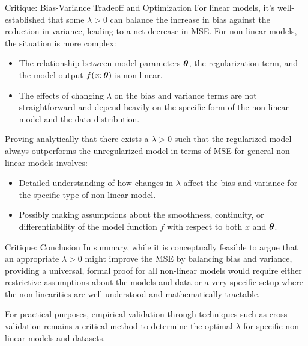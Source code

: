 \documentclass[11pt,compress,t,notes=noshow, xcolor=table]{beamer}
\begin{document}
\begin{vbframe}{Critique: Bias-Variance Tradeoff and Optimization}
For linear models, it's well-established that some \(\lambda > 0\) can balance the increase in bias against the reduction in variance, leading to a net decrease in MSE. For non-linear models, the situation is more complex:

\begin{itemize}
    \item The relationship between model parameters \(\bm{\theta}\), the regularization term, and the model output \(f(x; \bm{\theta})\) is non-linear.
    \item The effects of changing \(\lambda\) on the bias and variance terms are not straightforward and depend heavily on the specific form of the non-linear model and the data distribution.
\end{itemize}
Proving analytically that there exists a \(\lambda > 0\) such that the regularized model always outperforms the unregularized model in terms of MSE for general non-linear models involves:

\begin{itemize}
    \item Detailed understanding of how changes in \(\lambda\) affect the bias and variance for the specific type of non-linear model.
    \item Possibly making assumptions about the smoothness, continuity, or differentiability of the model function \(f\) with respect to both \(x\) and \(\bm{\theta}\).
\end{itemize}


\end{vbframe}


\begin{vbframe}{Critique: Conclusion}
In summary, while it is conceptually feasible to argue that an appropriate \(\lambda > 0\) might improve the MSE by balancing bias and variance, providing a universal, formal proof for all non-linear models would require either restrictive assumptions about the models and data or a very specific setup where the non-linearities are well understood and mathematically tractable.

For practical purposes, empirical validation through techniques such as cross-validation remains a critical method to determine the optimal \(\lambda\) for specific non-linear models and datasets.
\end{vbframe}
\end{document}
